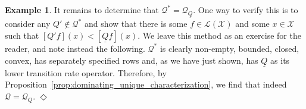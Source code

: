 \documentclass[10pt,a4paper]{paper}
\theoremstyle{definition}
\newtheorem{exmp}{Example}%
\newcommand{\states}{\mathcal{X}}
\newcommand{\gambles}{\mathcal{L}}
\newcommand{\gamblesX}{\gambles(\states)}
\newcommand{\rateset}{\mathcal{Q}}
\newcommand{\lrate}{\underline{Q}}
\newcommand{\coloneqq}{:\!=}
\newcommand{\exampleend}{\hfill$\Diamond$}
\begin{document}
\begin{exmp}


It remains to determine that $\rateset^*=\rateset_{\lrate}$. One way to verify this is to consider any $Q'\notin\rateset^*$ and show that there is some $f\in\gamblesX$ and some $x\in\states$ such that $[Q'f](x)<[\lrate f](x)$. We leave this method as an exercise for the reader, and note instead the following. $\rateset^*$ is clearly non-empty, bounded, closed, convex, has separately specified rows and, as we have just shown, has $\lrate$ as its lower transition rate operator. Therefore, by Proposition~\ref{prop:dominating_unique_characterization}, we find that indeed $\rateset=\rateset_{\lrate}$.
\exampleend
\end{exmp}
\end{document}
